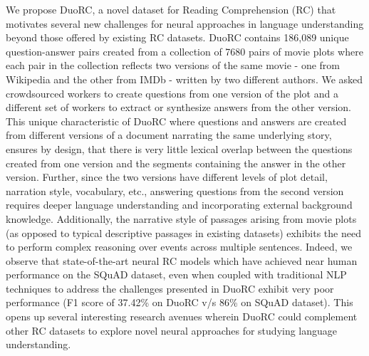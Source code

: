 We propose DuoRC, a novel dataset for Reading Comprehension (RC) that motivates several new challenges for neural approaches in language understanding beyond those offered by existing RC datasets. DuoRC contains 186,089 unique question-answer pairs created from a collection of 7680 pairs of movie plots where each pair in the collection reflects two versions of the same movie - one from Wikipedia and the other from IMDb - written by two different authors. We asked crowdsourced workers to create questions from one version of the plot and a different set of workers to extract or synthesize answers from the other version. This unique characteristic of DuoRC where questions and answers are created from different versions of a document narrating the same underlying story, ensures by design, that there is very little lexical overlap between the questions created from one version and the segments containing the answer in the other version. Further, since the two versions have different levels of plot detail, narration style, vocabulary, etc., answering questions from the second version requires deeper language understanding and incorporating external background knowledge. Additionally, the narrative style of passages arising from movie plots (as opposed to typical descriptive passages in existing datasets) exhibits the need to perform complex reasoning over events across multiple sentences. Indeed, we observe that state-of-the-art neural RC models which have achieved near human performance on the SQuAD dataset, even when coupled with traditional NLP techniques to address the challenges presented in DuoRC exhibit very poor performance (F1 score of 37.42\% on DuoRC v/s 86\% on SQuAD dataset). This opens up several interesting research avenues wherein DuoRC could complement other RC datasets to explore novel neural approaches for studying language understanding.
